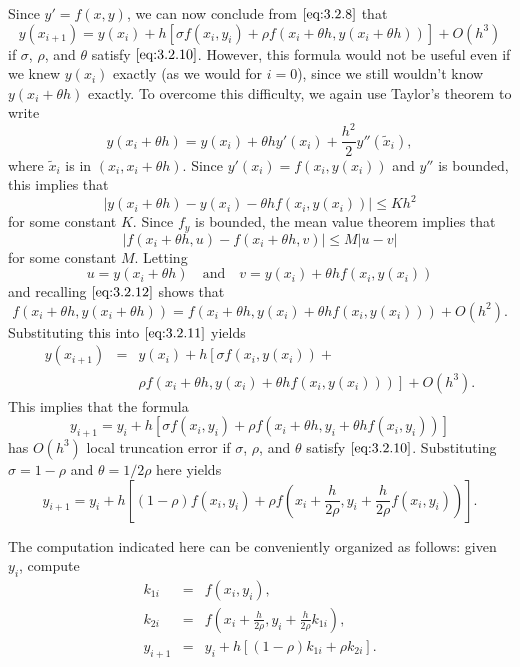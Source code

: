 \documentclass{ximera}
\begin{document}
Since $y'=f(x,y)$, we can now conclude from $\eqref{eq:3.2.8}$ that
\begin{equation} \label{eq:3.2.11}
y(x_{i+1})=y(x_i)+h\left[\sigma f(x_i,y_i)+\rho f(x_i+\theta
h,y(x_i+\theta h))\right]+O(h^3)
\end{equation}
if $\sigma$, $\rho$, and $\theta$ satisfy $\eqref{eq:3.2.10}$. However,
this formula would not be useful even if we knew $y(x_i)$ exactly (as
we would for $i=0$), since we still wouldn't know $y(x_i+\theta h)$
exactly. To overcome this difficulty, we again use Taylor's theorem to
write
$$
y(x_i+\theta h)=y(x_i)+\theta h y'(x_i)+\frac{h^2}{2}y''(\tilde x_i),
$$
where $\tilde x_i$ is in $(x_i,x_i+\theta h)$. Since
$y'(x_i)=f(x_i,y(x_i))$ and $y''$ is bounded, this implies that
\begin{equation} \label{eq:3.2.12}
|y(x_i+\theta h)-y(x_i)-\theta h f(x_i,y(x_i))|\leq Kh^2
\end{equation}
for some constant $K$. Since $f_y$ is bounded, the mean value theorem
implies that
$$
|f(x_i+\theta h,u)-f(x_i+\theta h,v)|\leq M|u-v|
$$
for some constant $M$. Letting
$$
u=y(x_i+\theta h)\quad\mbox{and}\quad
v=y(x_i)+\theta h f(x_i,y(x_i))
$$
and recalling $\eqref{eq:3.2.12}$ shows that
$$
f(x_i+\theta h,y(x_i+\theta h))=f(x_i+\theta h,y(x_i)+\theta h
f(x_i,y(x_i)))+O(h^2).
$$
Substituting this into $\eqref{eq:3.2.11}$   yields
\begin{eqnarray*}
y(x_{i+1})&=&y(x_i)+h\left[\sigma f(x_i,y(x_i))+\right.\\&&\left.\rho
f(x_i+\theta h,y(x_i)+\theta hf(x_i,y(x_i)))\right]+O(h^3).
\end{eqnarray*}
This implies that the formula
$$
y_{i+1}=y_i+h\left[\sigma f(x_i,y_i)+\rho f(x_i+\theta
h,y_i+\theta hf(x_i,y_i))\right]
$$
has $O(h^3)$ local truncation error if $\sigma$, $\rho$, and $\theta$
satisfy $\eqref{eq:3.2.10}$. Substituting $\sigma=1-\rho$ and
$\theta=1/2\rho$ here yields
\begin{equation} \label{eq:3.2.13}
y_{i+1}=y_i+h\left[(1-\rho)f(x_i,y_i)+\rho
f\left(x_i+\frac{h}{2\rho},
y_i+\frac{h}{2\rho}f(x_i,y_i)\right)\right].
\end{equation}

The computation indicated here can be conveniently organized as
follows: given $y_i$, compute
\begin{eqnarray*}
k_{1i}&=&f(x_i,y_i),\\
k_{2i}&=&f\left(x_i+\frac{h}{2\rho},
y_i+\frac{h}{2\rho}k_{1i}\right),\\
y_{i+1}&=&y_i+h[(1-\rho)k_{1i}+\rho k_{2i}].
\end{eqnarray*}
\end{document}
